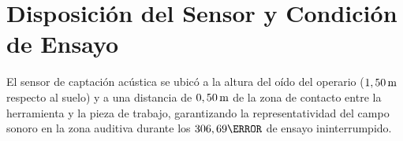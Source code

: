 \section{Disposición del Sensor y Condición de Ensayo}
El sensor de captación acústica se ubicó a la altura del oído del operario ($1,50\,\mathrm{m}$ respecto al suelo) y a una distancia
de $0,50\,\mathrm{m}$ de la zona de contacto entre la herramienta y la pieza de trabajo, garantizando la representatividad del campo
sonoro en la zona auditiva durante los $306,69\s$ de ensayo ininterrumpido.
